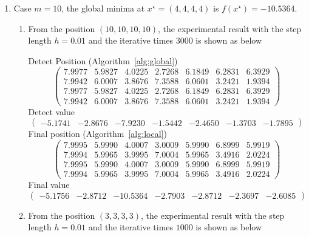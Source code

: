\documentclass[11pt,fceqn]{article}
\numberwithin{equation}{section}
\theoremstyle{definition}
\begin{document}
\begin{enumerate}[label=\textbf{(\arabic*)}]
\begin{enumerate}[label=\textbf{(\alph*)}]
Detect Position (Algorithm~\ref{alg:global})
$$
\begin{pmatrix}
4.0593 & 3.0228  \\
3.9976 & 7.1782  \\
4.0593 & 3.0228  \\
3.9976 & 7.1782 
\end{pmatrix}
$$
Detect value
$$
\begin{pmatrix}
-9.7595 & -2.4073 
\end{pmatrix}
$$
Final position (Algorithm~\ref{alg:local})
$$
\begin{pmatrix}
4.0006 & 3.0006  \\
3.9996 & 7.0008  \\
4.0006 & 3.0006 \\
3.9996 & 7.0008
\end{pmatrix}
$$
Final value
$$
\begin{pmatrix}
-10.4029 & -2.7496
\end{pmatrix}
$$
\end{enumerate}
\item Case $m=10$, the global minima at $x^{\star} = (4,4,4,4)$ is $f(x^{\star}) = - 10.5364$.
\begin{enumerate}[label=\textbf{(\alph*)}]
\item From the position $(10,10,10,10)$, the experimental result with the step length $h=0.01$ and the iterative times $3000$ is shown as below

Detect Position (Algorithm~\ref{alg:global})
$$
\begin{pmatrix}
7.9977 & 5.9827 & 4.0225 & 2.7268 & 6.1849 & 6.2831 & 6.3929 \\
7.9942 & 6.0007 & 3.8676 & 7.3588 & 6.0601 & 3.2421 & 1.9394 \\
7.9977 & 5.9827 & 4.0225 & 2.7268 & 6.1849 & 6.2831 & 6.3929 \\
7.9942 & 6.0007 & 3.8676 & 7.3588 & 6.0601 & 3.2421 & 1.9394
\end{pmatrix}
$$
 Detect value 
$$
\begin{pmatrix}
-5.1741 & -2.8676 & -7.9230 & -1.5442 & -2.4650 &-1.3703 &-1.7895
\end{pmatrix}
$$
Final position (Algorithm~\ref{alg:local})
$$
\begin{pmatrix}
7.9995 & 5.9990 & 4.0007 & 3.0009 & 5.9990 & 6.8999 &5.9919 \\
7.9994 & 5.9965 & 3.9995 & 7.0004 & 5.9965 & 3.4916 &2.0224 \\
7.9995 & 5.9990 & 4.0007 & 3.0009 & 5.9990 & 6.8999 &5.9919 \\
7.9994 & 5.9965 & 3.9995 & 7.0004 & 5.9965 & 3.4916 &2.0224
\end{pmatrix}
$$
Final value
$$
\begin{pmatrix}
-5.1756 & -2.8712 & -10.5364 & -2.7903 & -2.8712 & -2.3697 & -2.6085
\end{pmatrix}
$$
\item From the position $(3,3,3,3)$, the experimental result with the step length $h=0.01$ and the iterative times $1000$ is shown as below


\end{enumerate}
\end{enumerate}
\end{document}
